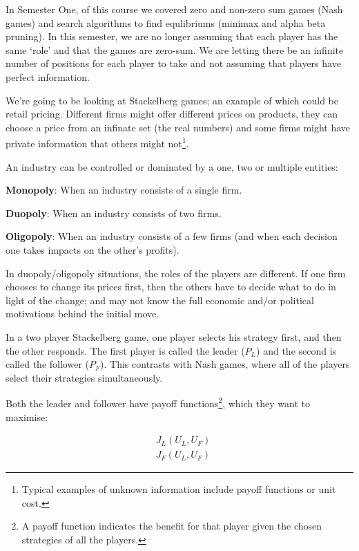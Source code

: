 
In Semester One, of this course we covered zero and non-zero sum games (Nash
games) and search algorithms to find equlibriums (minimax and alpha beta
pruning). In this semester, we are no longer assuming that each player has the
same `role' and that the games are zero-sum. We are letting there be an infinite
number of positions for each player to take and not assuming that players have
perfect information.

We're going to be looking at Stackelberg games; an example of which could be
retail pricing. Different firms might offer different prices on products, they
can choose a price from an infinate set (the real numbers) and some firms might
have private information that others might not\footnote{Typical examples of
unknown information include payoff functions or unit cost.}.

An industry can be controlled or dominated by a one, two or multiple entities:

\begin{description}
  \item \textbf{Monopoly}: When an industry consists of a single firm.
  \item \textbf{Duopoly}: When an industry consists of two firms.
  \item \textbf{Oligopoly}: When an industry consists of a few firms (and when
  each decision one takes impacts on the other's profits).
\end{description}

In duopoly/oligopoly situations, the roles of the players are different. If one
firm chooses to change its prices first, then the others have to decide what to
do in light of the change; and may not know the full economic and/or political
motivations behind the initial move.

In a two player Stackelberg game, one player selects his strategy first, and
then the other responds. The first player is called the leader ($P_L$) and the
second is called the follower ($P_F$). This contrasts with Nash games, where all
of the players select their strategies simultaneously.

Both the leader and follower have payoff functions\footnote{A payoff function
indicates the benefit for that player given the chosen strategies of all the
players.}, which they want to maximise:

\[
  \begin{split}
  &J_L(U_L, U_F)\\
  &J_F(U_L, U_F)
  \end{split}
\]

